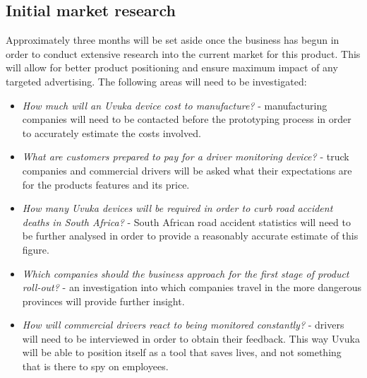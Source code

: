 \subsection{Initial market research}
Approximately three months will be set aside once the business has begun in order to conduct extensive research into the current market for this product. This will allow for better product positioning and ensure maximum impact of any targeted advertising. The following areas will need to be investigated:
\begin{itemize}
	\item \textit{How much will an Uvuka device cost to manufacture?} - manufacturing companies will need to be contacted before the prototyping process in order to accurately estimate the costs involved.
	\item \textit{What are customers prepared to pay for a driver monitoring device?} - truck companies and commercial drivers will be asked what their expectations are for the products features and its price.
	\item \textit{How many Uvuka devices will be required in order to curb road accident deaths in South Africa?} - South African road accident statistics will need to be further analysed in order to provide a reasonably accurate estimate of this figure.
	\item \textit{Which companies should the business approach for the first stage of product roll-out?} - an investigation into which companies travel in the more dangerous provinces will provide further insight.
	\item \textit{How will commercial drivers react to being monitored constantly?} - drivers will need to be interviewed in order to obtain their feedback. This way Uvuka will be able to position itself as a tool that saves lives, and not something that is there to spy on employees.
\end{itemize}

